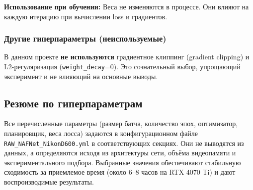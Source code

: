\documentclass[12pt,a4paper]{article}
\begin{document}
\textbf{Использование при обучении:}  
Веса не изменяются в процессе. Они влияют на каждую итерацию при вычислении loss и градиентов.

\subsubsection{Другие гиперпараметры (неиспользуемые)}

В данном проекте \textbf{не используются} градиентное клиппинг (gradient clipping) и L2-регуляризация (\texttt{weight\_decay}=0). Это сознательный выбор, упрощающий эксперимент и не влияющий на основные выводы.

\subsection{Резюме по гиперпараметрам}

Все перечисленные параметры (размер батча, количество эпох, оптимизатор, планировщик, веса лосса) задаются в конфигурационном файле \texttt{RAW\_NAFNet\_NikonD600.yml} в соответствующих секциях. Они не выводятся из данных, а определяются исходя из архитектуры сети, объёма видеопамяти и экспериментального подбора. Выбранные значения обеспечивают стабильную сходимость за приемлемое время (около 6--8 часов на RTX 4070 Ti) и дают воспроизводимые результаты.
\end{document}
